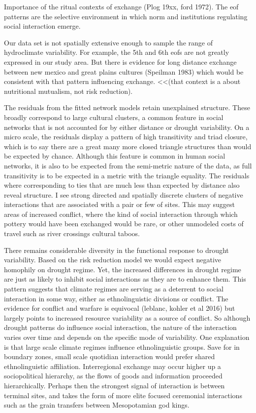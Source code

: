 \documentclass[10pt]{iopart}
\begin{document}
Importance of the ritual contexts of exchange (Plog 19xx, ford 1972). The eof patterns are the selective environment in which norm and institutions regulating social interaction emerge. 

Our data set is not spatially extensive enough to sample the range of hydroclimate variability. For example, the 5th and 6th eofs are not greatly expressed in our study area. But there is evidence for long distance exchange between new mexico and great plains cultures (Speilman 1983) which would be consistent with that pattern influencing exchange. <<(that context is a about nutritional mutualism, not risk reduction).

The residuals from the fitted network models retain unexplained structure. These broadly correspond to large cultural clusters, a common feature in social networks that is not accounted for by either distance or drought variability. On a micro scale, the residuals display a pattern of high transitivity and triad closure, which is to say there are a great many more closed triangle structures than would be expected by chance. Although this feature is common in human social networks, it is also to be expected from the semi-metric nature of the data, as full transitivity is to be expected in a metric with the triangle equality. The residuals where corresponding to ties that are much less than expected by distance also reveal structure. I see strong directed and spatially discrete clusters of negative interactions that are associated with a pair or few of sites. This may suggest areas of increased conflict, where the kind of social interaction through which pottery would have been exchanged would be rare, or other unmodeled costs of travel such as river crossings cultural taboos. 

There remains considerable diversity in the functional response to drought variability. Based on the risk reduction model we would expect negative homophily on drought regime. Yet, the increased differences in drought regime are just as likely to inhibit social interactions as they are to enhance them. This pattern suggests that climate regimes are serving as a deterrent to social interaction in some way, either as ethnolinguistic divisions or conflict. The evidence for conflict and warfare is equivocal \parencite{Kohler2014TheSouthwest}(leblanc, kohler et al 2016) but largely points to increased resource variability as a source of conflict. So although drought patterns do influence social interaction, the nature of the interaction varies over time and depends on the specific mode of variability. One explanation is that large scale climate regimes influence ethnolinguistic groups. Save for in boundary zones, small scale quotidian interaction would prefer shared ethnolinguistic affiliation. Interregional exchange may occur higher up a sociopolitical hierarchy, as the flows of goods and information proceeded hierarchically. Perhaps then the strongest signal of interaction is between terminal sites, and takes the form of more elite focused ceremonial interactions such as the grain transfers between Mesopotamian god kings.
\end{document}
